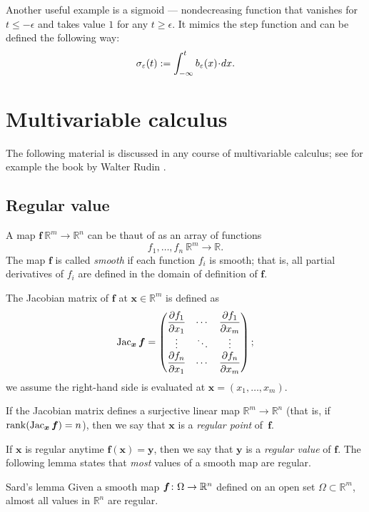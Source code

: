Another useful example is a sigmoid --- nondecreasing function that vanishes for $t\le -\epsilon$ and takes value $1$ for any $t\ge \epsilon$.
It mimics the step function and can be defined the following way: \label{page:sigma-function}
\[\sigma_\epsilon(t)
\df 
\int_{-\infty}^t b_\epsilon(x)\cdot dx.\]

\section{Multivariable calculus}\label{sec:Multivariable calculus}

The following material is discussed in any course of multivariable calculus;
see for example the book by Walter Rudin \cite{rudin}.

\subsection*{Regular value}

A map $\bm{f}\:\mathbb{R}^m\to\mathbb{R}^n$ can be thaut of as an array of functions 
\[f_1,\dots,f_n\:\mathbb{R}^m\to \mathbb{R}.\]
The map $\bm{f}$ is called \emph{smooth} if each function $f_i$ is smooth;
that is, all partial derivatives of $f_i$ are defined in the domain of definition of $\bm{f}$.

The Jacobian matrix of $\bm{f}$ at $\bm{x}\in\mathbb{R}^m$ is defined as 
\[\mathop{\rm Jac}\nolimits_{\bm{x}}\bm{f}=
\begin{pmatrix}
\dfrac{\partial f_1}{\partial x_1} & \cdots & \dfrac{\partial f_1}{\partial x_m}\\
\vdots & \ddots & \vdots\\
\dfrac{\partial f_n}{\partial x_1} & \cdots & \dfrac{\partial f_n}{\partial x_m} \end{pmatrix};\]
we assume the right-hand side is evaluated at $\bm{x}=(x_1,\dots,x_m)$.

If the Jacobian matrix defines a surjective linear map $\mathbb{R}^m\to\mathbb{R}^n$ (that is, if $\mathop{\rm rank}\nolimits(\mathop{\rm Jac}\nolimits_{\bm{x}}\bm{f})=n$), then we say that 
$\bm{x}$ is a \emph{regular point} of~$\bm{f}$.

If $\bm{x}$ is regular anytime $\bm{f}(\bm{x})=\bm{y}$,
then we say that $\bm{y}$ is a \emph{regular value} of $\bm{f}$.
The following lemma states that \textit{most} values of a smooth map are regular.

\begin{thm}{Sard's lemma}\label{lem:sard}
Given a smooth map $\bm{f}\colon \Omega \z\to \mathbb{R}^n$ defined on an open set $\Omega\subset \mathbb{R}^m$, almost all values in $\mathbb{R}^n$ are regular.
\end{thm}

